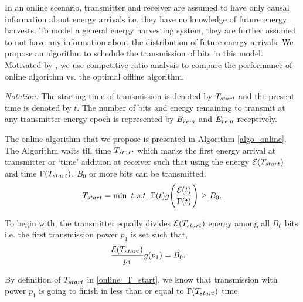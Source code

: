 In an online scenario, transmitter and receiver are assumed to have only causal information about energy arrivals i.e. they have no knowledge of future energy harvests. To model a general energy harvesting system, they are further assumed to not have any information about the distribution of future energy arrivals. We propose an algorithm to schedule the transmission of bits in this model. Motivated by \cite{VazeCompetitive}, we use competitive ratio analysis to compare the performance of online algorithm vs. the optimal offline algorithm.  
 
\textit{Notation:} The starting time of transmission is denoted by $T_{\mbox{\scriptsize{start}}}$ and the present time is denoted by $t$. The number of bits and energy remaining to transmit at any transmitter energy epoch is represented by $B_{\mbox{\scriptsize{rem}}}$ and $E_{\mbox{\scriptsize{rem}}}$ receptively.

The online algorithm that we propose is presented in Algorithm \ref{algo_online}. The Algorithm waits till time $T_{\mbox{\scriptsize{start}}}$ which marks the first energy arrival at transmitter or `time' addition at receiver such that using the energy $\ETx(T_{\mbox{\scriptsize{start}}})$ and time $\TRx(T_{\mbox{\scriptsize{start}}})$, $B_0$ or more bits can be transmitted.
\begin{equation}
T_{\mbox{\scriptsize{start}}}=\min\ t \ s.t.\  \TRx(t)g\Bigg{(} \dfrac{\ETx(t)}{\TRx(t)}\Bigg{)}\ge B_0.\label{online_T_start}
\end{equation}

To begin with, the transmitter equally divides $\ETx(T_{\mbox{\scriptsize{start}}})$ energy among all $B_0$ bits i.e. the first transmission power $p_1$ is set such that,
\begin{align}
&\frac{\ETx(T_{\mbox{\scriptsize{start}}})}{p_1}g(p_1)=B_0.
\end{align}

By definition of $T_{\mbox{\scriptsize{start}}}$ in \eqref{online_T_start}, we know that transmission with power $p_1$ is going to finish in less than or equal to  $\TRx(T_{\mbox{\scriptsize{start}}})$ time.

